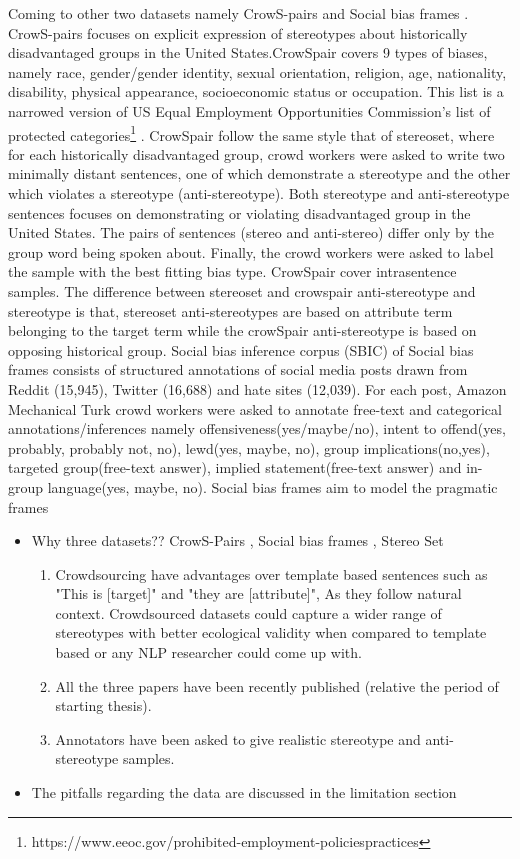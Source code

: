 Coming to other two datasets namely CrowS-pairs \cite{nangia2020crows} and Social bias frames \cite{sap2019social}. CrowS-pairs focuses on explicit expression of stereotypes about historically disadvantaged groups in the United States.CrowSpair covers 9 types of biases, namely race, gender/gender identity, sexual orientation, religion, age, nationality, disability, physical appearance, socioeconomic status or occupation. This list is a narrowed version of US Equal Employment Opportunities Commission's list of protected categories\footnote{https://www.eeoc.gov/prohibited-employment-policiespractices} \cite{nangia2020crows}. CrowSpair follow the same style that of stereoset\cite{nadeem2020stereoset}, where for each historically disadvantaged group, crowd workers were asked to write two minimally distant sentences, one of which demonstrate a stereotype and the other which violates a stereotype (anti-stereotype). Both stereotype and anti-stereotype sentences focuses on demonstrating or violating disadvantaged group in the United States. The pairs of sentences (stereo and anti-stereo) differ only by the group word being spoken about. Finally, the crowd workers were asked to label the sample with the best fitting bias type. CrowSpair cover intrasentence samples. The difference between stereoset and crowspair anti-stereotype and stereotype is that, stereoset anti-stereotypes are based on attribute term belonging to the target term while the crowSpair anti-stereotype is based on opposing historical group. Social bias inference corpus (SBIC) of Social bias frames consists of structured annotations of social media posts drawn from Reddit (15,945), Twitter (16,688) and hate sites (12,039). For each post, Amazon Mechanical Turk crowd workers were asked to annotate free-text and categorical annotations/inferences namely offensiveness(yes/maybe/no), intent to offend(yes, probably, probably not, no), lewd(yes, maybe, no), group implications(no,yes), targeted group(free-text answer), implied statement(free-text answer) and in-group language(yes, maybe, no). Social bias frames aim to model the pragmatic frames 
\begin{itemize}
    \item Why three datasets?? CrowS-Pairs \cite{nangia2020crows}, Social bias frames \cite{sap2019social}, Stereo Set \cite{nadeem2020stereoset}
    \begin{enumerate}
        \item Crowdsourcing have advantages over template based sentences such as "This is [target]" and "they are [attribute]", As they follow natural context. Crowdsourced datasets could capture a wider range of stereotypes with better ecological validity when compared to template based or any NLP researcher could come up with. \cite{blodgett2021stereotyping}
        \item All the three papers have been recently published (relative the period of starting thesis).
        \item Annotators have been asked to give realistic stereotype and anti-stereotype samples.
    \end{enumerate}
    \item The pitfalls regarding the data are discussed in the limitation section 
\end{itemize}
